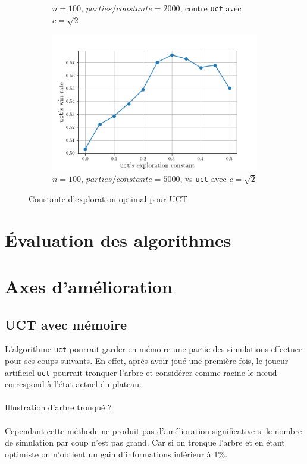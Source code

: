 \documentclass[a4paper]{article}
\theoremstyle{definition}
\begin{document}
\begin{figure}[!h]
\begin{subfigure}{0.32\textwidth}
		\caption{$n=100$, $parties/constante = 2000$, contre \texttt{uct} avec $c = \sqrt{2}$}
		\label{fig:2_}
	\end{subfigure}
	\hfill
	\begin{subfigure}{0.32\textwidth}
		\centering
		\includegraphics[width=\textwidth]{test3.png}
		\caption{$n=100$, $parties/constante = 5000$, vs \texttt{uct} avec $c = \sqrt{2}$}
		\label{fig:3_}
	\end{subfigure}
	\caption{Constante d'exploration optimal pour UCT}
	\label{fig:best-cst}
\end{figure}

\newpage

\section{Évaluation des algorithmes}


\newpage

\section{Axes d'amélioration}

\subsection{UCT avec mémoire}

L'algorithme \texttt{uct} pourrait garder en mémoire une partie des simulations effectuer pour ses coups suivants. En effet, après avoir joué une première fois, le joueur artificiel \texttt{uct} pourrait tronquer l'arbre et considérer comme racine le nœud correspond à l'état actuel du plateau.\\
\\
Illustration d'arbre tronqué ?\\
\\
Cependant cette méthode ne produit pas  d'amélioration significative si le nombre de simulation par coup n'est pas grand. Car si on tronque l'arbre et en étant optimiste on n'obtient un gain d'informations inférieur à 1\%.
\end{document}
